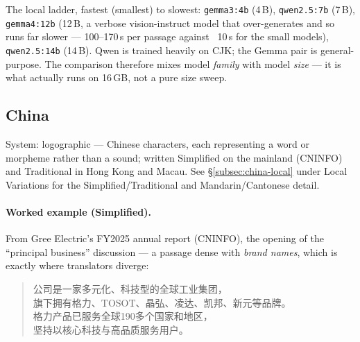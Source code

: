 \documentclass[11pt,a4paper]{report}
\begin{document}
\noindent The local ladder, fastest (smallest) to slowest: \texttt{gemma3:4b} (4\,B), \texttt{qwen2.5:7b}
(7\,B), \texttt{gemma4:12b} (12\,B, a verbose vision-instruct model that over-generates and so runs far
slower --- 100--170\,s per passage against ~10\,s for the small models), \texttt{qwen2.5:14b} (14\,B). Qwen
is trained heavily on CJK; the Gemma pair is general-purpose. The comparison therefore mixes model
\emph{family} with model \emph{size} --- it is what actually runs on 16\,GB, not a pure size sweep.

\subsection{China}
System: logographic --- Chinese characters, each representing a word or morpheme rather than a sound; written
Simplified on the mainland (CNINFO) and Traditional in Hong Kong and Macau. See
\S\ref{subsec:china-local} under Local Variations for the Simplified/Traditional and Mandarin/Cantonese detail.

\paragraph{Worked example (Simplified).} From Gree Electric's FY2025 annual report (CNINFO), the opening of
the ``principal business'' discussion --- a passage dense with \emph{brand names}, which is exactly where
translators diverge:
\begin{quote}
{\cjkCNfont 公司是一家多元化、科技型的全球工业集团，\\
旗下拥有格力、TOSOT、晶弘、凌达、凯邦、新元等品牌。\\
格力产品已服务全球190多个国家和地区，\\
坚持以核心科技与高品质服务用户。}
\end{quote}
\end{document}
